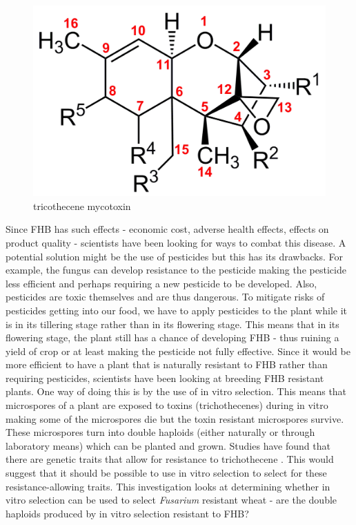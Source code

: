 \documentclass[11pt]{article}
\begin{document}
\begin{figure}[h]
\centering
\includegraphics[width=\textwidth]{trich}
\caption{tricothecene mycotoxin}
\end{figure}

Since FHB has such effects - economic cost, adverse health effects, effects on product quality - scientists have been looking for ways to combat this disease.
A potential solution might be the use of pesticides but this has its drawbacks. For example, the fungus can develop resistance to the pesticide making the pesticide less efficient and perhaps 
requiring a new pesticide to be developed. 
Also, pesticides are toxic themselves and are thus dangerous. To mitigate risks of pesticides getting into our food, we have to apply pesticides to the plant while it is in its tillering stage 
rather than in its flowering stage. This means that in its flowering stage, the plant still has a chance of developing
FHB  - thus ruining a yield of crop or at least making the pesticide not fully effective. Since it would be
more efficient to have a plant that is naturally resistant to FHB rather than requiring pesticides, scientists have been looking at
breeding FHB resistant plants. One way of doing this is by the use of in vitro selection. This means that microspores of a plant are exposed
to toxins (trichothecenes) during in vitro making some of the microspores die but the toxin resistant microspores survive. These microspores turn into double haploids (either naturally or through laboratory means) which can be planted and grown. 
Studies have found that there are genetic traits that allow for resistance to trichothecene \cite{foroud2012differential}. This would suggest that it should be possible 
to use in vitro selection to select for these resistance-allowing traits. This investigation looks at determining whether in vitro selection can be used
to select \emph{Fusarium} resistant wheat - are the double haploids produced by in vitro selection resistant to FHB? 
\end{document}
